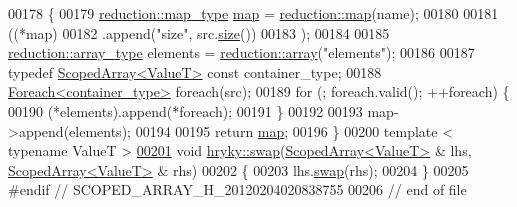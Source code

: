 \begin{DoxyCode}
00178 \{
00179     \hyperlink{classhryky_1_1_intrusive_ptr}{reduction::map_type} \hyperlink{namespacehryky_1_1reduction_ac5eae270cf8047b294dc4ff3e5e11a79}{map} = \hyperlink{namespacehryky_1_1reduction_ac5eae270cf8047b294dc4ff3e5e11a79}{reduction::map}(name);
00180 
00181     ((*map)
00182      .append(\textcolor{stringliteral}{"size"}, src.\hyperlink{classhryky_1_1_scoped_array_a89cb48b5dbd1f1c95fab59516119eeb5}{size}())
00183      );
00184 
00185     \hyperlink{classhryky_1_1_intrusive_ptr}{reduction::array_type} elements = \hyperlink{namespacehryky_1_1reduction_a9d45a4dc1ea9a6668ebd192f296f788c}{reduction::array}(\textcolor{stringliteral}{"elements"});
00186 
00187     \textcolor{keyword}{typedef} \hyperlink{classhryky_1_1_scoped_array}{ScopedArray<ValueT>} \textcolor{keyword}{const} container\_type;
00188     \hyperlink{classhryky_1_1_foreach}{Foreach<container_type>} \textcolor{keywordflow}{foreach}(src);
00189     \textcolor{keywordflow}{for} (; \textcolor{keywordflow}{foreach}.valid(); ++\textcolor{keywordflow}{foreach}) \{
00190         (*elements).append(*\textcolor{keywordflow}{foreach});
00191     \}
00192 
00193     map->append(elements);
00194     
00195     \textcolor{keywordflow}{return} \hyperlink{namespacehryky_1_1reduction_ac5eae270cf8047b294dc4ff3e5e11a79}{map};
00196 \}
00200 \textcolor{keyword}{template} < \textcolor{keyword}{typename} ValueT >
\hypertarget{scoped__array_8h_source_l00201}{}\hyperlink{namespacehryky_ab921feae350c8120f8c39673c98017a1}{00201} \textcolor{keywordtype}{void} \hyperlink{namespacehryky_a4282146df5ea2b68cb667896a2205909}{hryky::swap}(\hyperlink{classhryky_1_1_scoped_array}{ScopedArray<ValueT>} & lhs, \hyperlink{classhryky_1_1_scoped_array}{ScopedArray<ValueT>} & rhs)
00202 \{
00203     lhs.\hyperlink{classhryky_1_1_scoped_array_ade5a9800bdfb865fee2dba3da9cad6dc}{swap}(rhs);
00204 \}
00205 \textcolor{preprocessor}{#endif // SCOPED\_ARRAY\_H\_20120204020838755}
00206 \textcolor{preprocessor}{}\textcolor{comment}{// end of file}
\end{DoxyCode}
